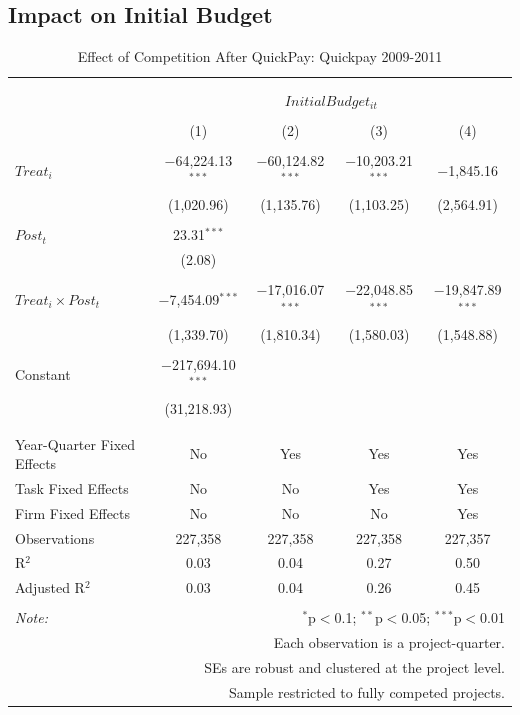 \documentclass[
]{article}
\begin{document}
\hypertarget{impact-on-initial-budget}{%
\subsection{Impact on Initial Budget}\label{impact-on-initial-budget}}

\begin{table}[H] \centering 
  \caption{Effect of Competition After QuickPay: Quickpay 2009-2011} 
  \label{} 
\small 
\begin{tabular}{@{\extracolsep{-2pt}}lcccc} 
\\[-1.8ex]\hline 
\hline \\[-1.8ex] 
\\[-1.8ex] & \multicolumn{4}{c}{$InitialBudget_{it}$} \\ 
\\[-1.8ex] & (1) & (2) & (3) & (4)\\ 
\hline \\[-1.8ex] 
 $Treat_i$ & $-$64,224.13$^{***}$ & $-$60,124.82$^{***}$ & $-$10,203.21$^{***}$ & $-$1,845.16 \\ 
  & (1,020.96) & (1,135.76) & (1,103.25) & (2,564.91) \\ 
  & & & & \\ 
 $Post_t$ & 23.31$^{***}$ &  &  &  \\ 
  & (2.08) &  &  &  \\ 
  & & & & \\ 
 $Treat_i \times Post_t$ & $-$7,454.09$^{***}$ & $-$17,016.07$^{***}$ & $-$22,048.85$^{***}$ & $-$19,847.89$^{***}$ \\ 
  & (1,339.70) & (1,810.34) & (1,580.03) & (1,548.88) \\ 
  & & & & \\ 
 Constant & $-$217,694.10$^{***}$ &  &  &  \\ 
  & (31,218.93) &  &  &  \\ 
  & & & & \\ 
\hline \\[-1.8ex] 
Year-Quarter Fixed Effects & No & Yes & Yes & Yes \\ 
Task Fixed Effects & No & No & Yes & Yes \\ 
Firm Fixed Effects & No & No & No & Yes \\ 
Observations & 227,358 & 227,358 & 227,358 & 227,357 \\ 
R$^{2}$ & 0.03 & 0.04 & 0.27 & 0.50 \\ 
Adjusted R$^{2}$ & 0.03 & 0.04 & 0.26 & 0.45 \\ 
\hline 
\hline \\[-1.8ex] 
\textit{Note:}  & \multicolumn{4}{r}{$^{*}$p$<$0.1; $^{**}$p$<$0.05; $^{***}$p$<$0.01} \\ 
 & \multicolumn{4}{r}{Each observation is a project-quarter.} \\ 
 & \multicolumn{4}{r}{SEs are robust and clustered at the project level.} \\ 
 & \multicolumn{4}{r}{Sample restricted to fully competed projects.} \\ 
\end{tabular} 
\end{table}
\end{document}

